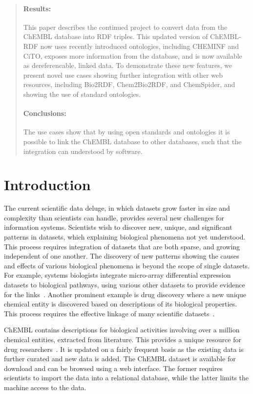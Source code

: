 \documentclass[10pt]{bmc_article}
\newenvironment{bmcformat}{\begin{raggedright}\baselineskip20pt\sloppy\setboolean{publ}{false}}{\end{raggedright}\baselineskip20pt\sloppy}
\begin{document}
\begin{bmcformat}
\begin{abstract}
\paragraph*{Results:}
This paper describes the continued project to convert data from the ChEMBL database into RDF triples.
This updated version of ChEMBL-RDF now uses recently introduced ontologies, including CHEMINF and CiTO,
exposes more information from the database, and is now available as dereferencable, linked data.
To demonstrate these new features, we present novel use cases showing further integration with
other web resources, including Bio2RDF, Chem2Bio2RDF, and ChemSpider, and showing the use of standard
ontologies.
\paragraph*{Conclusions:}
The use cases show that by using open standards and ontologies it is possible to link the ChEMBL database
to other databases, such that the integration can understood by software. 
\end{abstract}



\section*{Introduction}
\label{s1}


The current scientific data deluge, in which datasets grow faster in size and complexity than scientists can handle,
provides several new challenges for information systems. Scientists wish to 
discover new, unique, and significant patterns in datasets, which explaining biological 
phenomena not yet understood. This process requires integration of datasets that are both 
sparse, and growing independent of one another. The discovery of new patterns showing the 
causes and effects of various biological phenomena is beyond the scope of single datasets.
For example, systems biologists integrate micro-array differential expression datasets to 
biological pathways, using various other datasets to provide evidence for the links~\cite{Staab2007}. 
Another prominent example is drug discovery where a new unique chemical entity is discovered 
based on descriptions of its biological properties. This process requires the effective 
linkage of many scientific datasets~\cite{Samwald2011,Williams2012}.

ChEMBL contains descriptions for biological activities involving over a million chemical 
entities, extracted from literature. This provides a unique resource for drug researchers~\cite{Gaulton2012,Warr2009}.
It is updated on a fairly frequent basis as the existing data is further curated and new data is added. 
The ChEMBL dataset is available for download and can be browsed using a web interface. 
The former requires scientists to import the data into a relational database, while the 
latter limits the machine access to the data.


\end{bmcformat}
\end{document}
